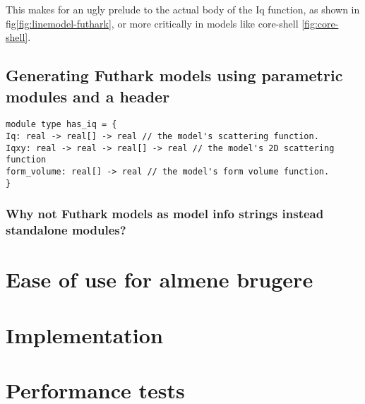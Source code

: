 \documentclass[11pt]{article}
\begin{document}
This makes for an ugly prelude to the actual body of the Iq function, as shown
in fig\ref{fig:linemodel-futhark}, or more critically in models like 
core-shell \ref{fig:core-shell}.


\subsection{Generating Futhark models using parametric modules and a header}
\label{sec:generating-futhark}
\begin{lstlisting}
module type has_iq = {
Iq: real -> real[] -> real // the model's scattering function.
Iqxy: real -> real -> real[] -> real // the model's 2D scattering function
form_volume: real[] -> real // the model's form volume function.
}  
\end{lstlisting}




\subsubsection{Why not Futhark models as model info strings instead standalone modules?}


\section{Ease of use for almene brugere}

\section{Implementation}

\section{Performance tests}
\end{document}
